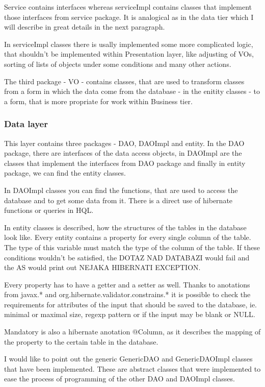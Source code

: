 \documentclass[thesis=B,english]{FITthesis}[2012/10/20]
\begin{document}
Service contains interfaces whereas serviceImpl contains classes that implement those interfaces from service package. It is analogical as in the data tier which I will describe in great details in the next paragraph.

In serviceImpl classes there is usally implemented some more complicated logic, that shouldn't be implemented within Presentation layer, like adjusting of VOs, sorting of lists of objects under some conditions and many other actions.

The third package - VO - contains classes, that are used to transform classes from a form in which the data come from the database - in the enitity classes - to a form, that is more propriate for work within Business tier.
\subsubsection{Data layer}
This layer contains three packages - DAO, DAOImpl and entity. In the DAO package, there are interfaces of the data access objects, in DAOImpl are the classes that implement the interfaces from DAO package and finally in entity package, we can find the entity classes.

In DAOImpl classes you can find the functions, that are used to access the database and to get some data from it. There is a direct use of hibernate functions or queries in HQL.

In entity classes is described, how the structures of the tables in the database look like. Every entity contains a property for every single column of the table. The type of this variable must match the type of the column of the table. If these conditions wouldn't be satisfied, the DOTAZ NAD DATABAZI would fail and the AS would print out NEJAKA HIBERNATI EXCEPTION.

Every property has to have a getter and a setter as well. Thanks to anotations from javax.* and org.hibernate.validator.constrains.* it is possible to check the requirements for attributes of the input that should be saved to the database, ie. minimal or maximal size, regexp pattern or if the input may be blank or NULL.

Mandatory is also a hibernate anotation @Column, as it describes the mapping of the property to the certain table in the database.

I would like to point out the generic GenericDAO and GenericDAOImpl classes that have been implemented.
These are abstract classes that were implemented to ease the process of programming of the other DAO and DAOImpl classes.
\end{document}

